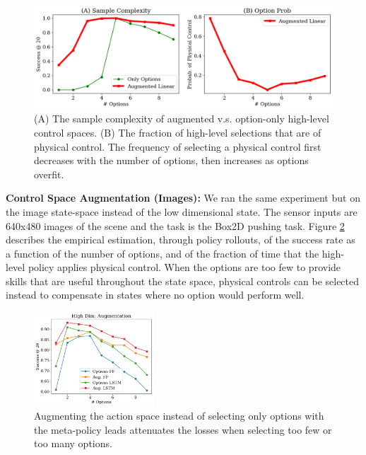 \begin{figure}[ht!]
    \centering
    \includegraphics[width=\textwidth]{ddco-experiments/exp1-3.png}
    \caption{ (A) The sample complexity of augmented v.s. option-only high-level control spaces. (B) The fraction of high-level selections that are of physical control. The frequency of selecting a physical control first decreases with the number of options, then increases as options overfit. \label{fig:b2dexp1-3}}
\end{figure}


\vspace{0.25em}\noindent\textbf{Control Space Augmentation (Images): }  We ran the same experiment but on the image state-space instead of the low dimensional state.
The sensor inputs are 640x480 images of the scene and the task is the Box2D pushing task.
Figure \ref{fig:augimages} describes the empirical estimation, through policy rollouts, of the success rate as a function of the number of options, and of the fraction of time that the high-level policy applies physical control.
When the options are too few to provide skills that are useful throughout the state space, physical controls can be selected instead to compensate in states where no option would perform well. 

\begin{figure} [ht!]
\centering
    \includegraphics[width=0.4\textwidth]{ddco-experiments/exp7-1.png}
    \caption{Augmenting the action space instead of selecting only options with the meta-policy leads attenuates the losses when selecting too few or too many options. \label{fig:augimages}}
\end{figure}



